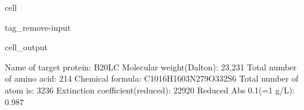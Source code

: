 \documentclass[letterpaper,10pt,english]{jupyterBook}
\begin{document}
\begin{sphinxuseclass}{cell}
\begin{sphinxuseclass}{tag_remove-input}\begin{sphinxVerbatimOutput}

\begin{sphinxuseclass}{cell_output}
\begin{sphinxVerbatim}[commandchars=\\\{\}]
\PYGZsh{} Name of target protein: \PYGZhy{}\PYGZhy{}\PYGZhy{}\PYGZhy{}\PYGZhy{}\PYGZhy{}\PYGZhy{}\PYGZhy{}\PYGZhy{}\PYGZhy{}\PYGZhy{}\PYGZhy{}\PYGZhy{}\PYGZhy{}\PYGZhy{}\PYGZhy{}\PYGZhy{}\PYGZhy{}\PYGZhy{}\PYGZhy{}\PYGZhy{}\PYGZhy{}\PYGZhy{}\PYGZhy{}\PYGZhy{}\PYGZhy{}\PYGZhy{}\PYGZhy{}\PYGZhy{}\PYGZhy{}\PYGZhy{}\PYGZhy{}\PYGZhy{}\PYGZhy{}B20\PYGZus{}LC
\PYGZsh{} Molecular weight(Dalton): \PYGZhy{}\PYGZhy{}\PYGZhy{}\PYGZhy{}\PYGZhy{}\PYGZhy{}\PYGZhy{}\PYGZhy{}\PYGZhy{}\PYGZhy{}\PYGZhy{}\PYGZhy{}\PYGZhy{}\PYGZhy{}\PYGZhy{}\PYGZhy{}\PYGZhy{}\PYGZhy{}\PYGZhy{}\PYGZhy{}\PYGZhy{}\PYGZhy{}\PYGZhy{}\PYGZhy{}\PYGZhy{}\PYGZhy{}\PYGZhy{}\PYGZhy{}\PYGZhy{}\PYGZhy{}\PYGZhy{}\PYGZhy{}23,231
\PYGZsh{} Total number of amino acid: \PYGZhy{}\PYGZhy{}\PYGZhy{}\PYGZhy{}\PYGZhy{}\PYGZhy{}\PYGZhy{}\PYGZhy{}\PYGZhy{}\PYGZhy{}\PYGZhy{}\PYGZhy{}\PYGZhy{}\PYGZhy{}\PYGZhy{}\PYGZhy{}\PYGZhy{}\PYGZhy{}\PYGZhy{}\PYGZhy{}\PYGZhy{}\PYGZhy{}\PYGZhy{}\PYGZhy{}\PYGZhy{}\PYGZhy{}\PYGZhy{}\PYGZhy{}\PYGZhy{}\PYGZhy{}\PYGZhy{}\PYGZhy{}\PYGZhy{}214
\PYGZsh{} Chemical formula: \PYGZhy{}\PYGZhy{}\PYGZhy{}\PYGZhy{}\PYGZhy{}\PYGZhy{}\PYGZhy{}\PYGZhy{}\PYGZhy{}\PYGZhy{}\PYGZhy{}\PYGZhy{}\PYGZhy{}\PYGZhy{}\PYGZhy{}\PYGZhy{}\PYGZhy{}\PYGZhy{}\PYGZhy{}\PYGZhy{}\PYGZhy{}\PYGZhy{}\PYGZhy{}\PYGZhy{}\PYGZhy{}\PYGZhy{}C1016H1603N279O332S6
\PYGZsh{} Total number of atom is: \PYGZhy{}\PYGZhy{}\PYGZhy{}\PYGZhy{}\PYGZhy{}\PYGZhy{}\PYGZhy{}\PYGZhy{}\PYGZhy{}\PYGZhy{}\PYGZhy{}\PYGZhy{}\PYGZhy{}\PYGZhy{}\PYGZhy{}\PYGZhy{}\PYGZhy{}\PYGZhy{}\PYGZhy{}\PYGZhy{}\PYGZhy{}\PYGZhy{}\PYGZhy{}\PYGZhy{}\PYGZhy{}\PYGZhy{}\PYGZhy{}\PYGZhy{}\PYGZhy{}\PYGZhy{}\PYGZhy{}\PYGZhy{}\PYGZhy{}\PYGZhy{}\PYGZhy{}3236
\PYGZsh{} Extinction coefficient(reduced): \PYGZhy{}\PYGZhy{}\PYGZhy{}\PYGZhy{}\PYGZhy{}\PYGZhy{}\PYGZhy{}\PYGZhy{}\PYGZhy{}\PYGZhy{}\PYGZhy{}\PYGZhy{}\PYGZhy{}\PYGZhy{}\PYGZhy{}\PYGZhy{}\PYGZhy{}\PYGZhy{}\PYGZhy{}\PYGZhy{}\PYGZhy{}\PYGZhy{}\PYGZhy{}\PYGZhy{}\PYGZhy{}\PYGZhy{}22920
\PYGZsh{} Reduced Abs 0.1\PYGZpc{}(=1 g/L): \PYGZhy{}\PYGZhy{}\PYGZhy{}\PYGZhy{}\PYGZhy{}\PYGZhy{}\PYGZhy{}\PYGZhy{}\PYGZhy{}\PYGZhy{}\PYGZhy{}\PYGZhy{}\PYGZhy{}\PYGZhy{}\PYGZhy{}\PYGZhy{}\PYGZhy{}\PYGZhy{}\PYGZhy{}\PYGZhy{}\PYGZhy{}\PYGZhy{}\PYGZhy{}\PYGZhy{}\PYGZhy{}\PYGZhy{}\PYGZhy{}\PYGZhy{}\PYGZhy{}\PYGZhy{}\PYGZhy{}\PYGZhy{}\PYGZhy{}0.987

\end{sphinxVerbatim}
\end{sphinxuseclass}
\end{sphinxVerbatimOutput}
\end{sphinxuseclass}
\end{sphinxuseclass}
\end{document}
